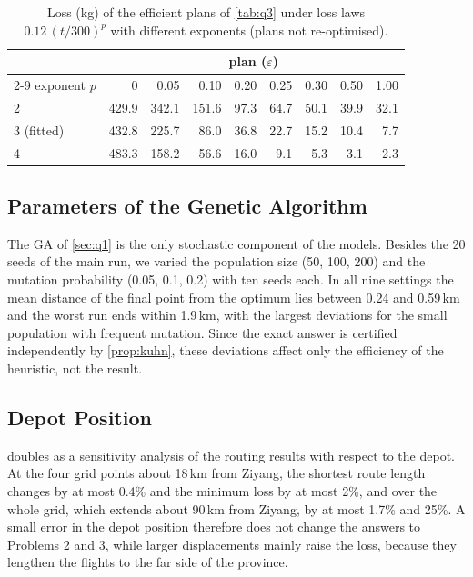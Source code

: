 \documentclass[11pt,a4paper]{article}
\theoremstyle{definition}
\begin{document}
\begin{table}[ht]
\centering
\caption{Loss (kg) of the efficient plans of \cref{tab:q3} under loss laws $0.12\,(t/300)^p$ with different exponents (plans not re-optimised).}\label{tab:law}
\small
\begin{tabular}{lrrrrrrrr}
\toprule
 & \multicolumn{8}{c}{plan ($\varepsilon$)} \\
\cmidrule(l){2-9}
exponent $p$ & 0 & 0.05 & 0.10 & 0.20 & 0.25 & 0.30 & 0.50 & 1.00 \\
\midrule
2 & 429.9 & 342.1 & 151.6 & 97.3 & 64.7 & 50.1 & 39.9 & 32.1 \\
3 (fitted) & 432.8 & 225.7 & 86.0 & 36.8 & 22.7 & 15.2 & 10.4 & 7.7 \\
4 & 483.3 & 158.2 & 56.6 & 16.0 & 9.1 & 5.3 & 3.1 & 2.3 \\
\bottomrule
\end{tabular}
\end{table}

\subsection{Parameters of the Genetic Algorithm}
The GA of \cref{sec:q1} is the only stochastic component of the models.
Besides the 20 seeds of the main run, we varied the population size (50, 100, 200) and the mutation probability (0.05, 0.1, 0.2) with ten seeds each.
In all nine settings the mean distance of the final point from the optimum lies between 0.24 and 0.59\,km and the worst run ends within 1.9\,km, with the largest deviations for the small population with frequent mutation.
Since the exact answer is certified independently by \cref{prop:kuhn}, these deviations affect only the efficiency of the heuristic, not the result.

\subsection{Depot Position}
 doubles as a sensitivity analysis of the routing results with respect to the depot.
At the four grid points about 18\,km from Ziyang, the shortest route length changes by at most 0.4\% and the minimum loss by at most 2\%, and over the whole grid, which extends about 90\,km from Ziyang, by at most 1.7\% and 25\%.
A small error in the depot position therefore does not change the answers to Problems 2 and 3, while larger displacements mainly raise the loss, because they lengthen the flights to the far side of the province.
\end{document}
